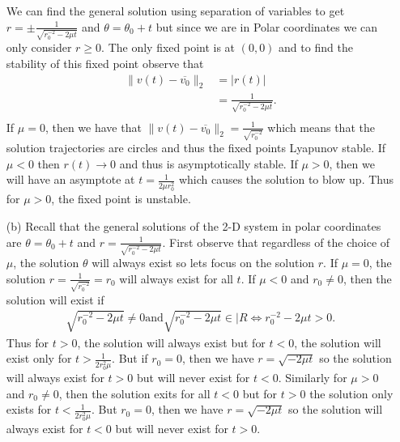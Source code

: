 \documentclass[12pt]{report}
\begin{document}
\begin{solution}
\begin{enumerate}
        We can find the general solution using separation of variables to get $r = \pm \frac{1}{\sqrt{r_0^{-2}-2\mu t}}$ and $\theta = \theta_0 + t$ but since we are in Polar coordinates we can only consider $r \geq 0$. The only fixed point is at $(0,0)$ and to find the stability of this fixed point observe that
        \begin{align*}
            \| v(t) - \overline{v_0} \|_2 &= |r(t)|\\
                &= \frac{1}{\sqrt{r_0^{-2}-2\mu t}}.\\
        \end{align*}
        If $\mu = 0$, then we have that $\| v(t) - \overline{v_0} \|_2 = \frac{1}{\sqrt{r_0^{-2}}}$ which means that the solution trajectories are circles and thus the fixed points Lyapunov stable. If $\mu < 0$ then $r(t) \rightarrow 0$ and thus is asymptotically stable. If $\mu > 0$, then we will have an asymptote at $t = \frac{1}{2 \mu r_0^2}$ which causes the solution to blow up. Thus for $\mu > 0$, the fixed point is unstable. 



        \item [(b)]
        Recall that the general solutions of the 2-D system in polar coordinates are $\theta = \theta_0 + t$ and $r = \frac{1}{\sqrt{r_0^{-2} - 2 \mu t}}$. First observe that regardless of the choice of $\mu$, the solution $\theta$ will always exist so lets focus on the solution $r$. If $\mu = 0$, the solution $r = \frac{1}{\sqrt{r_0^{-2}}} = r_0$ will always exist for all $t$. If $\mu < 0$ and $r_0 \neq 0$, then the solution will exist if
        \begin{align*}
            \sqrt{r_0^{-2} - 2 \mu t} \neq 0 \text{and} \sqrt{r_0^{-2} - 2 \mu t} \in |R \iff r_0^{-2} - 2 \mu t > 0.
        \end{align*}
        Thus for $t > 0$, the solution will always exist but for $t < 0$, the solution will exist only for $t > \frac{1}{2r_0^2\mu}$.  But if $r_0 = 0$, then we have $r=\sqrt{- 2 \mu t}$ so the solution will always exist for $t>0$ but will never exist for $t<0$. Similarly for $\mu > 0$ and $r_0 \neq 0$, then the solution exits for all $t<0$ but for $t>0$ the solution only exists for $t < \frac{1}{2r_0^2 \mu}$. But $r_0 = 0$, then we have $r=\sqrt{- 2 \mu t}$ so the solution will always exist for $t<0$ but will never exist for $t>0$.


    \end{enumerate}
\end{solution}
\end{document}
